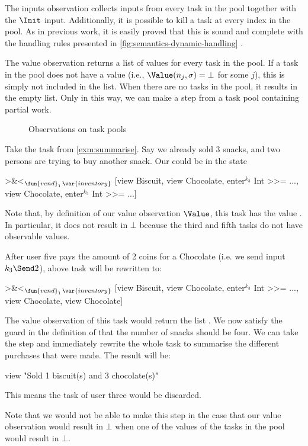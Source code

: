 The inputs observation collects inputs from every task in the pool
together with the $\Init$ input.
Additionally, it is possible to kill a task at every index in the pool.
As in previous work, it is easily proved that this is sound and complete with the handling rules presented in \cref{fig:semantics-dynamic-handling} \cite{Steenvoorden22}.

The value observation returns a list of values for every task in the pool.
If a task in the pool does not have a value (i.e., $\Value(n_j,\sigma) = \bot$ for some $j$),
this is simply not included in the list.
When there are no tasks in the pool, it results in the empty list.
Only in this way,
we can make a step from a task pool containing partial work.

\begin{figure}
  \caption{Observations on task pools}
  \label{fig:observations-dynamic}
\end{figure}

\begin{example}
  Take the  task from \cref{exm:summarise}.
  Say we already sold 3 snacks, and two persons are trying to buy another snack.
  Our  could be in the state
  \begin{TASK}
    >&<$_{\fun{vend}_1\,\var{inventory}}$ [view Biscuit, view Chocolate,
      enter$^{k_3}$ Int >>= ..., view Chocolate, enter$^{k_5}$ Int >>= ...]
  \end{TASK}
  Note that, by definition of our value observation $\Value$,
  this task has the value .
  In particular, it does not result in $\bot$ because the third and fifth tasks do not have observable values.

  After user five pays the amount of 2 coins for a Chocolate (i.e. we send input $k_3\Send2$),
  above task will be rewritten to:
  \begin{TASK}
    >&<$_{\fun{vend}_1\,\var{inventory}}$ [view Biscuit, view Chocolate,
      enter$^{k_3}$ Int >>= ..., view Chocolate, view Chocolate]
  \end{TASK}
  The value observation of this task would return the list .
  We now satisfy the guard in the definition of  that the number of snacks should be four.
  We can take the step and immediately rewrite the whole task to summarise the different purchases that were made.
  The result will be:
  \begin{TASK}
    view "Sold 1 biscuit(s) and 3 chocolate(s)"
  \end{TASK}
  This means the  task of user three would be discarded.

  Note that we would not be able to make this step in the case that our value observation would result in $\bot$ when one of the values of the tasks in the pool would result in $\bot$.
\end{example}